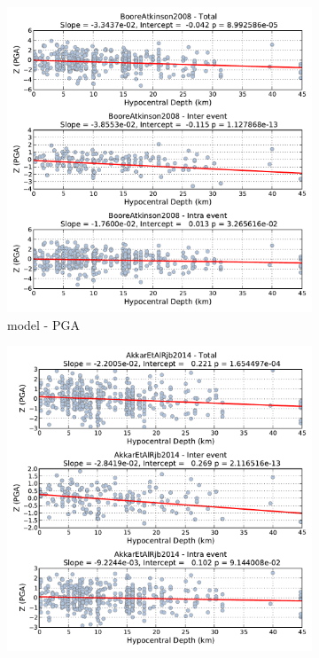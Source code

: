 \begin{figure}[htb]
  \centering
  \begin{subfigure}[b]{0.49\textwidth}
      \includegraphics[width=\textwidth]{./figures/residuals/BA2008_HypoDepth_PGA.pdf}
      \caption{\cite{boore2008} model - PGA}
      \label{fig:pga_depth_ba2008}
  \end{subfigure}
    \begin{subfigure}[b]{0.49\textwidth}
      \includegraphics[width=\textwidth]{./figures/residuals/Akkar2014_HypoDepth_PGA.pdf}

\end{subfigure}
\end{figure}
